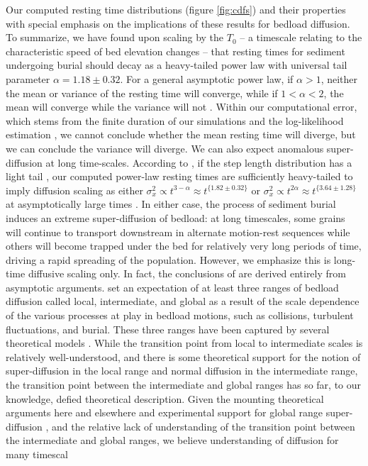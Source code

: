 \documentclass[draft]{agujournal2018}
\begin{document}
Our computed resting time distributions (figure \ref{fig:cdfs}) and their properties with special emphasis on the implications of these results for bedload diffusion.
To summarize, we have found upon scaling by the $T_0$ -- a timescale relating to the characteristic speed of bed elevation changes -- that resting times for sediment undergoing burial should decay as a heavy-tailed power law with universal tail parameter $\alpha = 1.18 \pm 0.32$.
For a general asymptotic power law, if $\alpha>1$, neither the mean or variance of the resting time will converge, while if $1<\alpha <2$, the mean will converge while the variance will not \citep[e.g.][]{Bradley2017}.
Within our computational error, which stems from the finite duration of our simulations and the log-likelihood estimation \citep[e.g.][]{Newman2005}, we cannot conclude whether the mean resting time will diverge, but we can conclude the variance will diverge.
We can also expect anomalous super-diffusion at long time-scales.
According to \citet{Weeks1998}, if the step length distribution has a light tail \citep[e.g.][]{Hassan2013}, our computed power-law resting times are sufficiently heavy-tailed to imply diffusion scaling as either $\sigma_x^2 \propto t^{3-\alpha} \approx t^{\{1.82 \pm 0.32 \}}$ or $\sigma_x^2 \propto t^{2\alpha} \approx t^{\{3.64\pm 1.28\}}$ at asymptotically large times \citep[e.g.][]{Bradley2017}.
In either case, the process of sediment burial induces an extreme super-diffusion of bedload: at long timescales, some grains will continue to transport downstream in alternate motion-rest sequences while others will become trapped under the bed for relatively very long periods of time, driving a rapid spreading of the population.
However, we emphasize this is long-time diffusive scaling only.
In fact, the conclusions of \citet{Weeks1998} are derived entirely from asymptotic arguments.
\citet{Nikora2001,Nikora2002} set an expectation of at least three ranges of bedload diffusion called local, intermediate, and global as a result of the scale dependence of the various processes at play in bedload motions, such as collisions, turbulent fluctuations, and burial.
These three ranges have been captured by several theoretical models \citep[e.g.]{Bialik2012,Zhang2012,Fan2016}.
While the transition point from local to intermediate scales is relatively well-understood, and there is some theoretical support for the notion of super-diffusion in the local range and normal diffusion in the intermediate range, the transition point between the intermediate and global ranges has so far, to our knowledge, defied theoretical description.
Given the mounting theoretical arguments here and elsewhere \citep[e.g.][]{Martin2014,} and experimental support for global range super-diffusion \citep[e.g.][]{Phillips2013,Bradley2017,Pretzlav2016,Olinde2015,Voepel2013}, and the relative lack of understanding of the transition point between the intermediate and global ranges, we believe understanding of diffusion for many timescal
\end{document}
